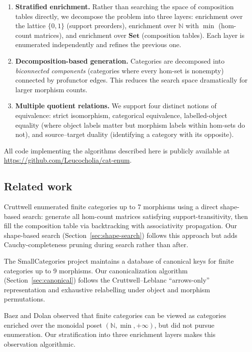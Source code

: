 \documentclass[12pt,a4paper]{amsart}
\theoremstyle{definition}
\theoremstyle{remark}
\newcommand{\Set}{\mathbf{Set}}
\begin{document}
\begin{enumerate}
\item \textbf{Stratified enrichment.}  Rather than searching the space of
  composition tables directly, we decompose the problem into three layers:
  enrichment over the lattice $\{0,1\}$ (support preorders), enrichment
  over $\mathbb{N}$ with $\min$ (hom-count matrices), and enrichment over
  $\Set$ (composition tables).  Each layer is enumerated independently and
  refines the previous one.
\item \textbf{Decomposition-based generation.}  Categories are decomposed
  into \emph{biconnected components} (categories where every hom-set is
  nonempty) connected by profunctor edges.  This reduces the search space
  dramatically for larger morphism counts.
\item \textbf{Multiple quotient relations.}  We support four distinct
  notions of equivalence: strict isomorphism, categorical equivalence,
  labelled-object equality (where object labels matter but morphism labels
  within hom-sets do not), and source--target duality (identifying a
  category with its opposite).
\end{enumerate}

All code implementing the algorithms described here is publicly available
at \url{https://github.com/Leucocholia/cat-enum}.

\subsection{Related work}

Cruttwell \cite{cruttwell2014} enumerated finite categories up to 7
morphisms using a direct shape-based search: generate all hom-count
matrices satisfying support-transitivity, then fill the composition table
via backtracking with associativity propagation.  Our shape-based search
(Section~\ref{sec:shape-search}) follows this approach but adds
Cauchy-completeness pruning during search rather than after.

The SmallCategories project \cite{smallcats} maintains a database of
canonical keys for finite categories up to 9 morphisms.  Our
canonicalization algorithm (Section~\ref{sec:canonical}) follows the
Cruttwell--Leblanc ``arrows-only'' representation and exhaustive
relabelling under object and morphism permutations.

Baez and Dolan \cite{baez2001} observed that finite categories can be
viewed as categories enriched over the monoidal poset $(\mathbb{N}, \min,
+\infty)$, but did not pursue enumeration.  Our stratification into three
enrichment layers makes this observation algorithmic.
\end{document}
